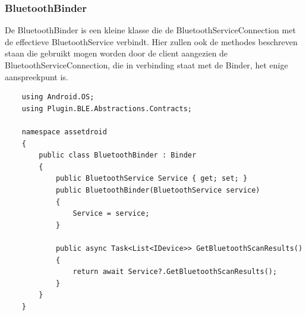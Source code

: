 \subsubsection{BluetoothBinder}
De BluetoothBinder is een kleine klasse die de BluetoothServiceConnection met de effectieve BluetoothService verbindt. Hier zullen ook de methodes beschreven staan die gebruikt mogen worden door de client aangezien de BluetoothServiceConnection, die in verbinding staat met de Binder, het enige aanspreekpunt is.
\begin{lstlisting}
    ﻿using Android.OS;
    using Plugin.BLE.Abstractions.Contracts;
    
    namespace assetdroid
    {
        public class BluetoothBinder : Binder
        {
            public BluetoothService Service { get; set; }
            public BluetoothBinder(BluetoothService service)
            {
                Service = service;
            }
            
            public async Task<List<IDevice>> GetBluetoothScanResults()
            {
                return await Service?.GetBluetoothScanResults();
            }
        }
    }
\end{lstlisting}
